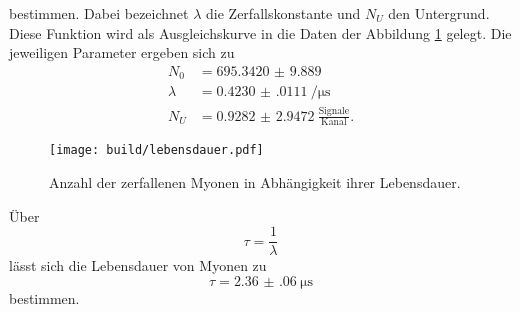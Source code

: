 bestimmen. Dabei bezeichnet $\lambda$ die Zerfallskonstante und $N_U$ den Untergrund. Diese Funktion wird als Ausgleichskurve in die Daten der Abbildung \ref{fig:leben} gelegt. Die jeweiligen Parameter ergeben sich zu
\begin{align*}
    N_0 &= \num{695.3420(98890)} \\
    \lambda &=  \SI{0.4230(0111)}{\per\micro\s} \\
    N_U &= \num{0.9282(29472)} \: \frac{\text{Signale}}{\text{Kanal}} .
\end{align*}

\begin{figure}
    \centering
    \texttt{[image: build/lebensdauer.pdf]}
    \caption{Anzahl der zerfallenen Myonen in Abhängigkeit ihrer Lebensdauer.}
    \label{fig:leben}
\end{figure}

Über 
\begin{equation}
\tau = \frac{1}{\lambda}     
\end{equation}
lässt sich die Lebensdauer von Myonen zu
\begin{equation}
    \tau = \SI{ 2.36(06)}{\micro\s}
\end{equation}
bestimmen.


%
